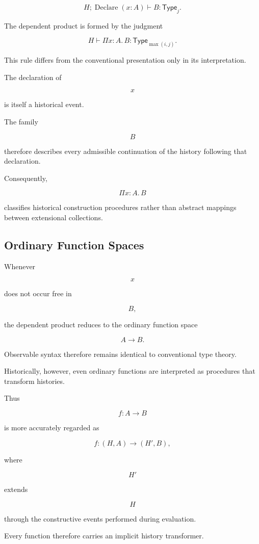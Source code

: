 \documentclass[12pt,oneside]{article}
\theoremstyle{definition}
\theoremstyle{remark}
\newcommand{\Type}{\mathsf{Type}}
\begin{document}
\[
H;
\operatorname{Declare}(x:A)
\vdash
B:\Type_j.
\]

The dependent product is formed by the judgment

\[
H
\vdash
\Pi x:A.\,B
:
\Type_{\max(i,j)}.
\]

This rule differs from the conventional presentation only in its interpretation.

The declaration of

\[
x
\]

is itself a historical event.

The family

\[
B
\]

therefore describes every admissible continuation of the history following that
declaration.

Consequently,

\[
\Pi x:A.\,B
\]

classifies historical construction procedures rather than abstract mappings
between extensional collections.

\subsection{Ordinary Function Spaces}

Whenever

\[
x
\]

does not occur free in

\[
B,
\]

the dependent product reduces to the ordinary function space

\[
A
\rightarrow
B.
\]

Observable syntax therefore remains identical to conventional type theory.

Historically, however, even ordinary functions are interpreted as procedures
that transform histories.

Thus

\[
f
:
A\rightarrow B
\]

is more accurately regarded as

\[
f
:
(H,A)
\longrightarrow
(H',B),
\]

where

\[
H'
\]

extends

\[
H
\]

through the constructive events performed during evaluation.

Every function therefore carries an implicit history transformer.
\end{document}
